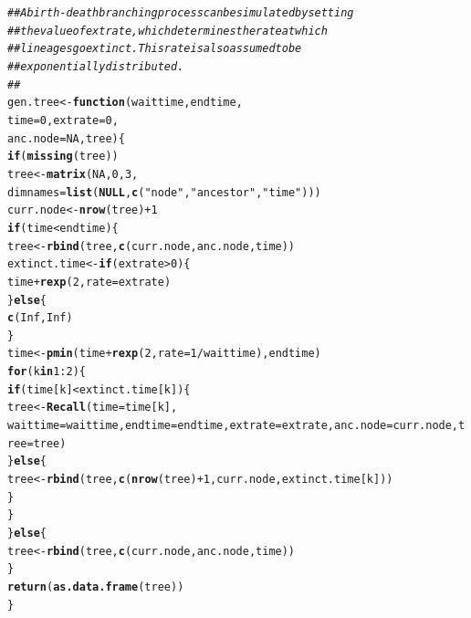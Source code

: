 \documentclass[12pt,reqno,final]{amsart}\usepackage[]{graphicx}\usepackage[]{color}
\makeatletter
\newcommand{\hlnum}[1]{\textcolor[rgb]{0.686,0.059,0.569}{#1}}%
\newcommand{\hlstr}[1]{\textcolor[rgb]{0.192,0.494,0.8}{#1}}%
\newcommand{\hlcom}[1]{\textcolor[rgb]{0.678,0.584,0.686}{\textit{#1}}}%
\newcommand{\hlopt}[1]{\textcolor[rgb]{0,0,0}{#1}}%
\newcommand{\hlstd}[1]{\textcolor[rgb]{0.345,0.345,0.345}{#1}}%
\newcommand{\hlkwa}[1]{\textcolor[rgb]{0.161,0.373,0.58}{\textbf{#1}}}%
\newcommand{\hlkwb}[1]{\textcolor[rgb]{0.69,0.353,0.396}{#1}}%
\newcommand{\hlkwc}[1]{\textcolor[rgb]{0.333,0.667,0.333}{#1}}%
\newcommand{\hlkwd}[1]{\textcolor[rgb]{0.737,0.353,0.396}{\textbf{#1}}}%
\newenvironment{kframe}{%
 \def\at@end@of@kframe{}%
 \ifinner\ifhmode%
  \def\at@end@of@kframe{\end{minipage}}%
  \begin{minipage}{\columnwidth}%
 \fi\fi%
 \def\FrameCommand##1{\hskip\@totalleftmargin \hskip-\fboxsep
 \colorbox{shadecolor}{##1}\hskip-\fboxsep
     \hskip-\linewidth \hskip-\@totalleftmargin \hskip\columnwidth}%
 \MakeFramed {\advance\hsize-\width
   \@totalleftmargin\z@ \linewidth\hsize
   \@setminipage}}%
 {\par\unskip\endMakeFramed%
 \at@end@of@kframe}
\newenvironment{knitrout}{}{} %
\theoremstyle{plain}
\numberwithin{equation}{part}
\makeatother
\begin{document}
\begin{knitrout}
\begin{kframe}
\begin{alltt}
\hlcom{## A birth-death branching process can be simulated by setting}
\hlcom{## the value of extrate, which determines the rate at which}
\hlcom{## lineages go extinct. This rate is also assumed to be}
\hlcom{## exponentially distributed.}
\hlcom{##}
\hlstd{gen.tree} \hlkwb{<-} \hlkwa{function}\hlstd{(}\hlkwc{waittime}\hlstd{,} \hlkwc{endtime}\hlstd{,}
                     \hlkwc{time} \hlstd{=} \hlnum{0}\hlstd{,} \hlkwc{extrate} \hlstd{=} \hlnum{0}\hlstd{,}
                     \hlkwc{anc.node} \hlstd{=} \hlnum{NA}\hlstd{,} \hlkwc{tree}\hlstd{) \{}
    \hlkwa{if} \hlstd{(}\hlkwd{missing}\hlstd{(tree))}
        \hlstd{tree} \hlkwb{<-} \hlkwd{matrix}\hlstd{(}\hlnum{NA}\hlstd{,}\hlnum{0}\hlstd{,}\hlnum{3}\hlstd{,}
                       \hlkwc{dimnames}\hlstd{=}\hlkwd{list}\hlstd{(}\hlkwa{NULL}\hlstd{,}\hlkwd{c}\hlstd{(}\hlstr{"node"}\hlstd{,}\hlstr{"ancestor"}\hlstd{,}\hlstr{"time"}\hlstd{)))}
    \hlstd{curr.node} \hlkwb{<-} \hlkwd{nrow}\hlstd{(tree)}\hlopt{+}\hlnum{1}
    \hlkwa{if} \hlstd{(time} \hlopt{<} \hlstd{endtime) \{}
        \hlstd{tree} \hlkwb{<-} \hlkwd{rbind}\hlstd{(tree,}\hlkwd{c}\hlstd{(curr.node,anc.node,time))}
        \hlstd{extinct.time} \hlkwb{<-} \hlkwa{if} \hlstd{(extrate} \hlopt{>} \hlnum{0}\hlstd{) \{}
            \hlstd{time}\hlopt{+}\hlkwd{rexp}\hlstd{(}\hlnum{2}\hlstd{,}\hlkwc{rate}\hlstd{=extrate)}
        \hlstd{\}} \hlkwa{else} \hlstd{\{}
            \hlkwd{c}\hlstd{(}\hlnum{Inf}\hlstd{,}\hlnum{Inf}\hlstd{)}
        \hlstd{\}}
        \hlstd{time} \hlkwb{<-} \hlkwd{pmin}\hlstd{(time}\hlopt{+}\hlkwd{rexp}\hlstd{(}\hlnum{2}\hlstd{,}\hlkwc{rate}\hlstd{=}\hlnum{1}\hlopt{/}\hlstd{waittime),endtime)}
        \hlkwa{for} \hlstd{(k} \hlkwa{in} \hlnum{1}\hlopt{:}\hlnum{2}\hlstd{) \{}
            \hlkwa{if} \hlstd{(time[k]} \hlopt{<} \hlstd{extinct.time[k]) \{}
                \hlstd{tree} \hlkwb{<-} \hlkwd{Recall}\hlstd{(}\hlkwc{time}\hlstd{=time[k],}
                               \hlkwc{waittime}\hlstd{=waittime,}\hlkwc{endtime}\hlstd{=endtime,}\hlkwc{extrate}\hlstd{=extrate,}\hlkwc{anc.node}\hlstd{=curr.node,}\hlkwc{tree}\hlstd{=tree)}
            \hlstd{\}} \hlkwa{else} \hlstd{\{}
                \hlstd{tree} \hlkwb{<-} \hlkwd{rbind}\hlstd{(tree,}\hlkwd{c}\hlstd{(}\hlkwd{nrow}\hlstd{(tree)}\hlopt{+}\hlnum{1}\hlstd{,curr.node,extinct.time[k]))}
            \hlstd{\}}
        \hlstd{\}}
    \hlstd{\}} \hlkwa{else} \hlstd{\{}
        \hlstd{tree} \hlkwb{<-} \hlkwd{rbind}\hlstd{(tree,}\hlkwd{c}\hlstd{(curr.node,anc.node,time))}
    \hlstd{\}}
    \hlkwd{return}\hlstd{(}\hlkwd{as.data.frame}\hlstd{(tree))}
\hlstd{\}}


\end{alltt}
\end{kframe}
\end{knitrout}
\end{document}
